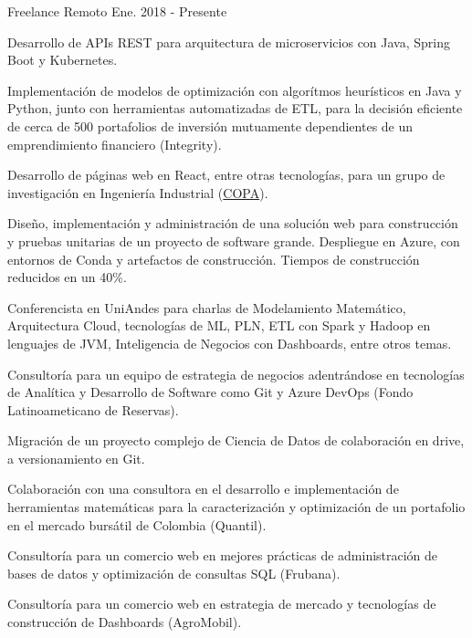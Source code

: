 

\begin{cventries}

	{Freelance} %
	{Remoto} %
	{Ene. 2018 {-} Presente} %
	{
		\begin{cvitems} %
			\item {Desarrollo de APIs REST para arquitectura de microservicios con Java, Spring Boot y Kubernetes.}
			\item {Implementación de modelos de optimización con algorítmos heurísticos en Java y Python, junto con herramientas automatizadas de ETL, para la decisión eficiente de cerca de 500 portafolios de inversión mutuamente dependientes de un emprendimiento financiero (Integrity).}
			\item {Desarrollo de páginas web en React, entre otras tecnologías, para un grupo de investigación en Ingeniería Industrial (\href{https://copa.uniandes.edu.co/en/}{COPA}).}
			\item {Diseño, implementación y administración de una solución web para construcción y pruebas unitarias de un proyecto de software grande. Despliegue en Azure, con entornos de Conda y artefactos de construcción. Tiempos de construcción reducidos en un 40\%.}
			\item {Conferencista en UniAndes para charlas de Modelamiento Matemático, Arquitectura Cloud, tecnologías de ML, PLN, ETL con Spark y Hadoop en lenguajes de JVM, Inteligencia de Negocios con Dashboards, entre otros temas.}
			\item {Consultoría para un equipo de estrategia de negocios adentrándose en tecnologías de Analítica y Desarrollo de Software como Git y Azure DevOps (Fondo Latinoameticano de Reservas).}
			\item {Migración de un proyecto complejo de Ciencia de Datos de colaboración en drive, a versionamiento en Git.}
			\item {Colaboración con una consultora en el desarrollo e implementación de herramientas matemáticas para la caracterización y optimización de un portafolio en el mercado bursátil de Colombia (Quantil).}
			\item {Consultoría para un comercio web en mejores prácticas de administración de bases de datos y optimización de consultas SQL (Frubana).}
			\item {Consultoría para un comercio web en estrategia de mercado y tecnologías de construcción de Dashboards (AgroMobil).}
		\end{cvitems}
	}


\end{cventries}
